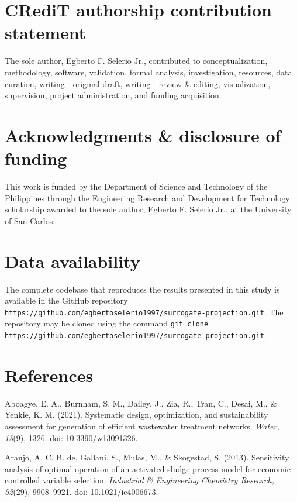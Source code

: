 \documentclass[a4paper,fleqn]{cas-sc}
\begin{document}
\section*{CRediT authorship contribution statement}

The sole author, Egberto F. Selerio Jr., contributed to conceptualization, methodology, software, validation, formal analysis, investigation, resources, data curation, writing---original draft, writing---review \& editing, visualization, supervision, project administration, and funding acquisition.

\section*{Acknowledgments \& disclosure of funding}

This work is funded by the Department of Science and Technology of the Philippines through the Engineering Research and Development for Technology scholarship awarded to the sole author, Egberto F. Selerio Jr., at the University of San Carlos.

\section*{Data availability}

The complete codebase that reproduces the results presented in this study is available in the GitHub repository \texttt{https://github.com/egbertoselerio1997/surrogate-projection.git}. The repository may be cloned using the command \texttt{git clone https://github.com/egbertoselerio1997/surrogate-projection.git}.

\section*{References}

\noindent Aboagye, E. A., Burnham, S. M., Dailey, J., Zia, R., Tran, C., Desai, M., \& Yenkie, K. M. (2021). Systematic design, optimization, and sustainability assessment for generation of efficient wastewater treatment networks. \textit{Water, 13}(9), 1326. doi: 10.3390/w13091326.

\noindent Araujo, A. C. B. de, Gallani, S., Mulas, M., \& Skogestad, S. (2013). Sensitivity analysis of optimal operation of an activated sludge process model for economic controlled variable selection. \textit{Industrial \& Engineering Chemistry Research, 52}(29), 9908--9921. doi: 10.1021/ie4006673.
\end{document}
